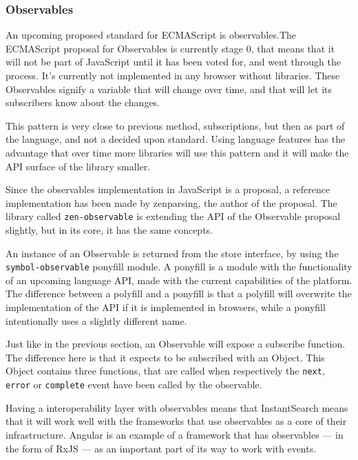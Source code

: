 
\subsubsection{Observables}
\label{ssub:observables}

An upcoming proposed standard for ECMAScript is observables.The ECMAScript proposal for Observables is currently stage 0\cite{tc39-observable}, that means that it will not be part of JavaScript until it has been voted for, and went through the process. It's currently not implemented in any browser without libraries. These Observables signify a variable that will change over time, and that will let its subscribers know about the changes.

This pattern is very close to previous method, subscriptions, but then as part of the language, and not a decided upon standard. Using language features has the advantage that over time more libraries will use this pattern and it will make the API surface of the library smaller.

Since the observables implementation in JavaScript is a proposal, a reference implementation has been made by zenparsing, the author of the proposal. The library called {\tt zen-observable}\cite{zenparsing-observable} is extending the API of the Observable proposal slightly, but in its core, it has the same concepts.

An instance of an Observable is returned from the store interface, by using the {\tt symbol-observable}\cite{symbol-observable} ponyfill module. A ponyfill\cite{ponyfill} is a module with the functionality of an upcoming language API, made with the current capabilities of the platform. The difference between a polyfill and a ponyfill is that a polyfill will overwrite the implementation of the API if it is implemented in browsers, while a ponyfill intentionally uses a slightly different name.

Just like in the previous section, an Observable will expose a subscribe function. The difference here is that it expects to be subscribed with an Object. This Object contains three functions, that are called when respectively the {\tt next}, {\tt error} or {\tt complete} event have been called by the observable.

Having a interoperability layer with observables means that InstantSearch means that it will work well with the frameworks that use observables as a core of their infrastructure. Angular is an example of a framework that has observables --- in the form of RxJS\cite{angular-rx} --- as an important part of its way to work with events.


